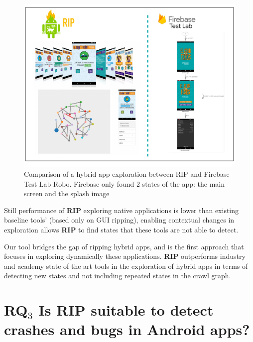 \begin{figure}[t]
	\centering
	\includegraphics[width=1\textwidth]{img/ripFirebase.pdf}
	\vspace{-0.5cm}
	\caption{Comparison of a hybrid app exploration between RIP and Firebase Test Lab Robo. Firebase only found 2 states of the app: the main screen and the splash image}
	
	\label{ripFirebase}
\end{figure} 

\begin{tcolorbox}[title= \textit{\textbf{RQ$_2$}} How accurate is the \textit{state discovery algorithm} implemented in RIP when compared to state-of-the art tools?]
	Still performance of \textbf{RIP} exploring native applications is lower than existing baseline tools' (based only on GUI ripping), enabling contextual changes in exploration allows \textbf{RIP} to find states that these tools are not able to detect. 
	
	Our tool bridges the gap of ripping hybrid apps, and is the first approach that focuses in exploring dynamically these applications. \textbf{RIP} outperforms industry and academy state of the art tools in the exploration of hybrid apps in terms of detecting new states and not including repeated states in the crawl graph. 
\end{tcolorbox}

\section{\textbf{RQ$_3$} Is RIP suitable to detect crashes and bugs in Android apps?}

